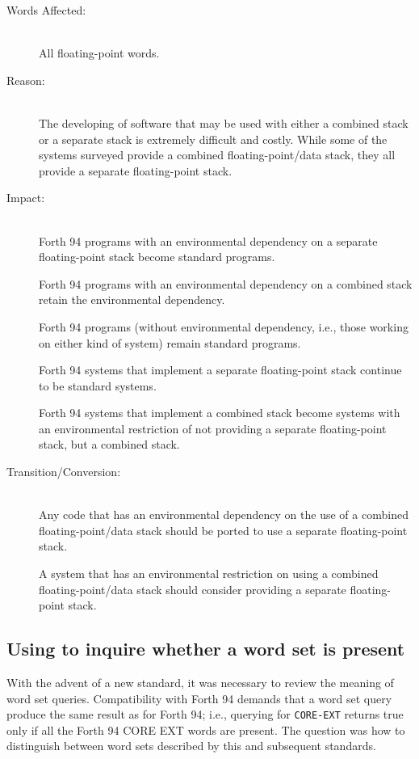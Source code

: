 \begin{description}
\item[Words Affected:] ~\\
	All floating-point words.

\item[Reason:] ~\\
	The developing of software that may be used with either a combined
	stack or a separate stack is extremely difficult and costly.  While
	some of the systems surveyed provide a combined floating-point/data
	stack, they all provide a separate floating-point stack.

\item[Impact:] ~\\
	Forth 94 programs with an environmental dependency on a separate
	floating-point stack become standard programs.

	Forth 94 programs with an environmental dependency on a combined
	stack retain the environmental dependency.

	Forth 94 programs (without environmental dependency, i.e., those
	working on either kind of system) remain standard programs.

	Forth 94 systems that implement a separate floating-point stack
	continue to be standard systems.

	Forth 94 systems that implement a combined stack become systems
	with an environmental restriction of not providing a separate
	floating-point stack, but a combined stack.

\item[Transition/Conversion:] ~\\
	Any code that has an environmental dependency on the use of a
	combined floating-point/data stack should be ported to use a
	separate floating-point stack.

	A system that has an environmental restriction on using a combined
	floating-point/data stack should consider providing a separate
	floating-point stack.
\end{description}


\subsection[Using ENVIRONMENT? to inquire whether a word set is present]{Using  to inquire whether a word set is present} %
\label{diff:environment}

With the advent of a new standard, it was necessary to review the
meaning of word set queries.  Compatibility with Forth 94 demands
that a word set query produce the same result as for Forth 94; i.e.,
querying for \texttt{CORE-EXT} returns true only if all the Forth 94
CORE EXT words are present.  The question was how to distinguish
between word sets described by this and subsequent standards.

